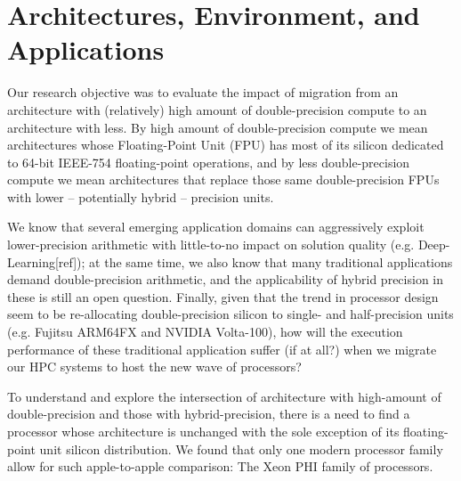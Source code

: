 \section{Architectures, Environment, and Applications}\label{sec:materials}

Our research objective was to evaluate the impact of migration from an architecture with (relatively) high amount of double-precision compute to an architecture with less. By high amount of double-precision compute we mean architectures whose Floating-Point Unit (FPU) has most of its silicon dedicated to 64-bit IEEE-754 floating-point operations, and by less double-precision compute we mean architectures that replace those same double-precision FPUs with lower -- potentially hybrid -- precision units.

We know that several emerging application domains can aggressively exploit lower-precision arithmetic with little-to-no impact on solution quality (e.g. Deep-Learning[ref]); at the same time, we also know that many traditional applications demand double-precision arithmetic, and the applicability of hybrid precision in these is still an open question. Finally, given that the trend in processor design seem to be re-allocating double-precision silicon to single- and half-precision units (e.g. Fujitsu ARM64FX and NVIDIA Volta-100), how will the execution performance of these traditional application suffer (if at all?) when we migrate our HPC systems to host the new wave of processors?

To understand and explore the intersection of architecture with high-amount of double-precision and those with hybrid-precision, there is a need to find a processor whose architecture is unchanged with the sole exception of its floating-point unit silicon distribution. We found that only one modern processor family allow for such apple-to-apple comparison: The Xeon PHI family of processors.


